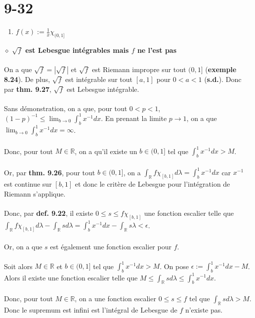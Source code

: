\documentclass[a4paper,10pt]{article}
\begin{document}
\section*{9-32}
\begin{enumerate}
	\item $f(x) := \frac{1}{x} \chi_{(0,1]}$
\end{enumerate}
$\diamond$ \textbf{$\sqrt{f}$ est Lebesgue intégrables mais $f$ ne l'est pas}
\\
\\
On a que $\sqrt{f} = |\sqrt{f}|$ et $\sqrt{f}$ est Riemann impropre sur tout $(0,1]$ (\textbf{exemple 8.24}). De plus, $\sqrt{f}$ est intégrable sur tout $[a,1]$ pour $0 < a < 1$ (\textbf{s.d.}). Donc par \textbf{thm. 9.27}, $\sqrt{f}$ est Lebesgue intégrable.
\\
\\
Sans démonstration, on a que, pour tout $0 < p < 1$, $(1-p)^{-1} \leq \lim_{b \to 0} \int_b^1 x^{-1}dx$. En prenant la limite $p \rightarrow 1$, on a que $\lim_{b \to 0} \int_b^1 x^{-1}dx = \infty$.
\\
\\
Donc, pour tout $M \in \mathbb{R}$, on a qu'il existe un $b \in (0,1]$ tel que $\int_b^1 x^{-1}dx > M$.
\\
\\
Or, par \textbf{thm. 9.26}, pour tout $b \in (0,1]$, on a $\int_\mathbb{R} f\chi_{[b,1]} d\lambda = \int_b^1 x^{-1}dx$ car $x^{-1}$ est continue sur $[b,1]$ et donc le critère de Lebesgue pour l'intégration de Riemann s'applique.
\\
\\
Donc, par \textbf{def. 9.22}, il existe $0 \leq s \leq f\chi_{[b,1]}$ une fonction escalier telle que $\int_\mathbb{R} f\chi_{[b,1]} d\lambda - \int_\mathbb{R} s d\lambda = \int_b^1 x^{-1}dx - \int_\mathbb{R} s \lambda < \epsilon$.
\\
\\
Or, on a que $s$ est également une fonction escalier pour $f$.
\\
\\
Soit alors $M \in \mathbb{R}$ et $b \in (0,1]$ tel que $\int_b^1 x^{-1} dx > M$. On pose $\epsilon := \int_b^1 x^{-1}dx - M$. Alors il existe une fonction escalier telle que $M \leq \int_\mathbb{R} s d\lambda \leq \int_b^1 x^{-1} dx$.
\\
\\
Donc, pour tout $M \in \mathbb{R}$, on a une fonction escalier $0 \leq s \leq f$ tel que $\int_\mathbb{R} s d\lambda > M$. Donc le supremum est infini est l'intégral de Lebesgue de $f$ n'existe pas.
\end{document}
